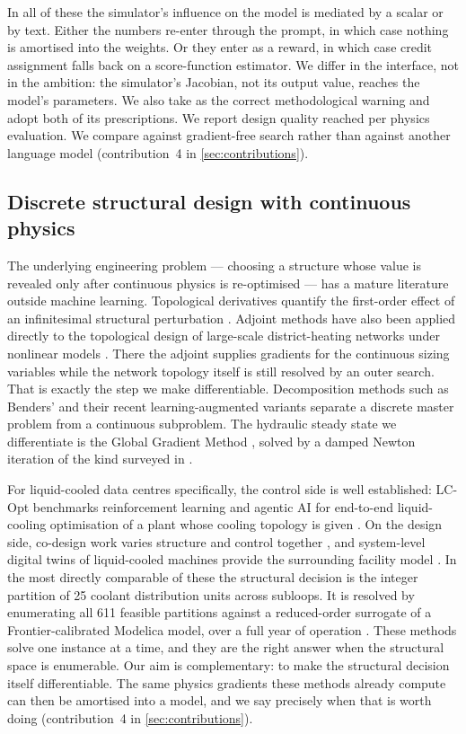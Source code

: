 In all of these the simulator's influence on the model is mediated by a scalar
or by text.  Either the numbers re-enter through the prompt, in which case
nothing is amortised into the weights.  Or they enter as a reward, in which case
credit assignment falls back on a score-function estimator.  We differ in the
interface, not in the ambition: the simulator's Jacobian, not its output value,
reaches the model's parameters.  We also take \cite{zhang2026leap} as the
correct methodological warning and adopt both of its prescriptions.  We report
design quality reached per physics evaluation.  We compare against
gradient-free search rather than against another language model
(contribution~4 in \cref{sec:contributions}).

\subsection{Discrete structural design with continuous physics}
\label{sec:rw-structural}
The underlying engineering problem --- choosing a structure whose value is
revealed only after continuous physics is re-optimised --- has a mature
literature outside machine learning.  Topological derivatives quantify the
first-order effect of an infinitesimal structural perturbation
\cite{sokolowski1999topological}.  Adjoint methods have also been applied directly
to the topological design of large-scale district-heating networks under
nonlinear models \cite{blommaert2020adjoint}.  There the adjoint supplies
gradients for the continuous sizing variables while the network topology itself
is still resolved by an outer search.  That is exactly the step we make
differentiable.  Decomposition methods such as Benders'
\cite{geoffrion1972benders} and their recent learning-augmented variants
\cite{agyeman2026benders} separate a discrete master problem from a continuous
subproblem.  The hydraulic steady state we differentiate is the Global Gradient
Method \cite{todini1988gga}, solved by a damped Newton iteration of
the kind surveyed in \cite{knoll2004jfnk}.

For liquid-cooled data centres specifically, the control side is well
established: LC-Opt benchmarks reinforcement learning and agentic AI for
end-to-end liquid-cooling optimisation of a plant whose cooling topology is
given \cite{lcopt2025}.  On the design side, co-design work varies structure and
control together \cite{jadhav2026codesign,jadhav2026lifecycle}, and
system-level digital twins of liquid-cooled machines provide the surrounding
facility model \cite{brewer2024exadigit}.  In the most directly comparable of
these the structural decision is the integer partition of 25 coolant
distribution units across subloops.  It is resolved by enumerating all 611
feasible partitions against a reduced-order surrogate of a Frontier-calibrated
Modelica model, over a full year of operation \cite{jadhav2026codesign}.  These methods solve
one instance at a time, and they are the right answer when the structural space
is enumerable.  Our aim is complementary: to make the structural decision itself
differentiable.  The same physics gradients these methods already compute can then
be amortised into a model, and we say precisely when that is worth doing
(contribution~4 in \cref{sec:contributions}).

